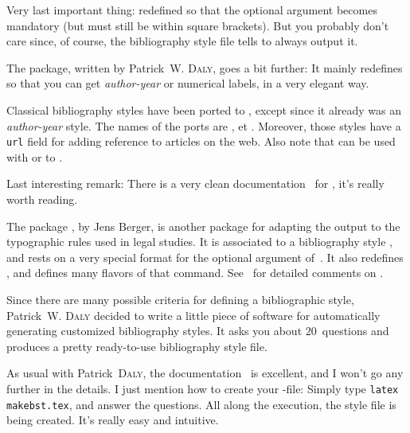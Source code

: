 Very last important thing:  redefined  
so that the optional argument becomes mandatory (but must still be
within square brackets). But you probably don't care since, of course,
the bibliography style file tells \bt to always output it.



The  package, written by Patrick~W. \textsc{Daly},
goes a bit further: It mainly redefines  so that you can
get \emph{author-year} or numerical labels, in a very elegant way.

Classical bibliography styles have been ported to ,
except  since it already was an \emph{author-year}
style. The names of the ports are
,  et . 
Moreover, those styles have a \texttt{url} field for adding reference
to articles on the web. Also note that  can be used with 
 or  to . 

Last interesting remark: There is a very clean 
documentation~\cite{natbib} for
, it's really worth reading.


The package , by Jens Berger, is another 
package for adapting
the output to the typographic rules used in legal studies. 
It is associated to a bibliography style , and
rests on a very special format for the optional argument 
of~. It also redefines , and defines 
many flavors of that command.
See~\cite{jurabib} for detailed comments on .


Since there are many possible criteria for defining a bibliographic
style, 
Patrick~W. \textsc{Daly} decided to write a little piece of software
for automatically generating customized bibliography styles. It asks
you about $20$~questions and produces a pretty ready-to-use
bibliography style file.

As usual with Patrick~\textsc{Daly}, 
the documentation~\cite{merlin} is excellent, and I
won't go any further in the details. I just mention how to create your
-file:
Simply type 
\verb+latex makebst.tex+, and answer the questions. All along the
execution, the style file is being created. It's really easy and
intuitive. 



